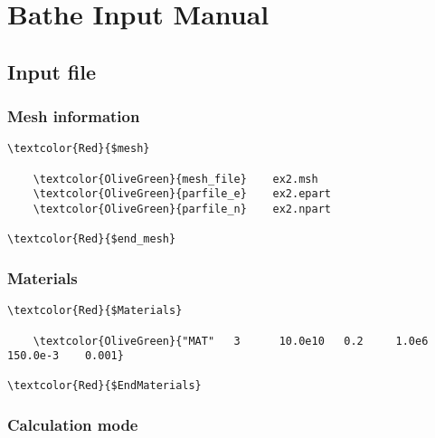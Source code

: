 \chapter*{Bathe Input Manual}




\section{Input file}

\subsection{Mesh information}

\begin{Verbatim}[frame=single,commandchars=\\\{\}]
\textcolor{Red}{$mesh}

    \textcolor{OliveGreen}{mesh_file}    ex2.msh
    \textcolor{OliveGreen}{parfile_e}    ex2.epart
    \textcolor{OliveGreen}{parfile_n}    ex2.npart

\textcolor{Red}{$end_mesh} 
\end{Verbatim}

\subsection{Materials}

\begin{Verbatim}[frame=single,commandchars=\\\{\}]
\textcolor{Red}{$Materials}

    \textcolor{OliveGreen}{"MAT"   3      10.0e10   0.2     1.0e6   150.0e-3    0.001}  
    
\textcolor{Red}{$EndMaterials}
\end{Verbatim}

\subsection{Calculation mode}

